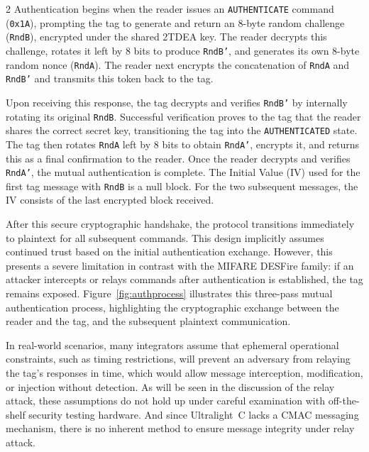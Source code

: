 \documentclass[10pt,letterpaper]{article}
\begin{document}
\begin{multicols}{2}
Authentication begins when the reader issues an \texttt{AUTHENTICATE} command (\texttt{0x1A}), prompting the tag to generate and return an 8-byte random challenge (\texttt{RndB}), encrypted under the shared 2TDEA key. The reader decrypts this challenge, rotates it left by 8 bits to produce \texttt{RndB'}, and generates its own 8-byte random nonce (\texttt{RndA}). The reader next encrypts the concatenation of \texttt{RndA} and \texttt{RndB'} and transmits this token back to the tag.

Upon receiving this response, the tag decrypts and verifies \texttt{RndB'} by internally rotating its original \texttt{RndB}. Successful verification proves to the tag that the reader shares the correct secret key, transitioning the tag into the \texttt{AUTHENTICATED} state. The tag then rotates \texttt{RndA} left by 8 bits to obtain \texttt{RndA'}, encrypts it, and returns this as a final confirmation to the reader. Once the reader decrypts and verifies \texttt{RndA'}, the mutual authentication is complete. The Initial Value (IV) used for the first tag message with \texttt{RndB} is a null block. For the two subsequent messages, the IV consists of the last encrypted block received.

After this secure cryptographic handshake, the protocol transitions immediately to plaintext for all subsequent commands. This design implicitly assumes continued trust based on the initial authentication exchange. However, this presents a severe limitation in contrast with the MIFARE DESFire family: if an attacker intercepts or relays commands after authentication is established, the tag remains exposed. Figure~\ref{fig:authprocess} illustrates this three-pass mutual authentication process, highlighting the cryptographic exchange between the reader and the tag, and the subsequent plaintext communication.


\vspace{5mm}

\captionsetup{hypcap=false}
\label{fig:authprocess}
\vspace{3.0mm}
\setlength{\parindent}{15pt}

In real-world scenarios, many integrators assume that ephemeral operational constraints, such as timing restrictions, will prevent an adversary from relaying the tag's responses in time, which would allow message interception, modification, or injection without detection. As will be seen in the discussion of the relay attack, these assumptions do not hold up under careful examination with off-the-shelf security testing hardware. And since Ultralight~C lacks a CMAC messaging mechanism, there is no inherent method to ensure message integrity under relay attack.


\end{multicols}
\end{document}

